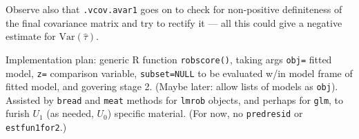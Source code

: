 \documentclass[12pt]{article}
\newcommand{\var}{\mathrm{Var}}
\begin{document}
Observe also that \texttt{.vcov.avar1} goes on to check for
non-positive definiteness of the final covariance matrix and try to
rectify it --- all this could give  a negative estimate for $\var(\hat\tau)$.


Implementation plan: generic R function \texttt{robscore()}, taking args
\texttt{obj=} fitted model, \texttt{z=} comparison variable,
\texttt{subset=NULL} to be evaluated w/in model frame of fitted model,
and govering stage 2.  (Maybe later: allow lists of models as
\texttt{obj}).  Assisted by \texttt{bread} and \texttt{meat} methods
for \texttt{lmrob} objects, and perhaps for \texttt{glm}, to furish
$U_{1}$ (as needed, $U_{0}$) specific material. (For now, no
\texttt{predresid} or \texttt{estfun1for2}.)


\end{document}
